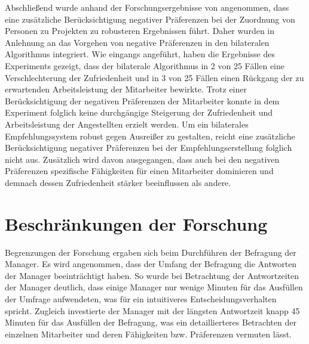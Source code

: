 Abschließend wurde anhand der Forschungsergebnisse von \textcite[S. 1ff.]{link:booklet} angenommen, dass eine zusätzliche Berücksichtigung negativer Präferenzen bei der Zuordnung von Personen zu Projekten zu robusteren Ergebnissen führt.
Daher wurden in Anlehnung an das Vorgehen von \textcite[S. 269ff.]{pizzato:2:inproceedings} negative Präferenzen in den bilateralen Algorithmus integriert.
Wie eingangs angeführt, haben die Ergebnisse des Experiments gezeigt, dass der bilaterale Algorithmus in 2 von 25 Fällen eine Verschlechterung der Zufriedenheit und in 3 von 25 Fällen einen Rückgang der zu erwartenden Arbeitsleistung der Mitarbeiter bewirkte.
Trotz einer Berücksichtigung der negativen Präferenzen der Mitarbeiter konnte in dem Experiment folglich keine durchgängige Steigerung der Zufriedenheit und Arbeitsleistung der Angestellten erzielt werden. 
Um ein bilaterales Empfehlungssystem robust gegen Ausreißer zu gestalten, reicht eine zusätzliche Berücksichtigung negativer Präferenzen bei der Empfehlungserstellung folglich nicht aus.
Zusätzlich wird davon ausgegangen, dass auch bei den negativen Präferenzen spezifische Fähigkeiten für einen Mitarbeiter dominieren und demnach dessen Zufriedenheit stärker beeinflussen als andere.


\section{Beschränkungen der Forschung}
Begrenzungen der Forschung ergaben sich beim Durchführen der Befragung der Manager.
Es wird angenommen, dass der Umfang der Befragung die Antworten der Manager beeinträchtigt haben.
So wurde bei Betrachtung der Antwortzeiten der Manager deutlich, dass einige Manager nur wenige Minuten für das Ausfüllen der Umfrage aufwendeten, was für ein intuitiveres Entscheidungsverhalten spricht.
Zugleich investierte der Manager mit der längsten Antwortzeit knapp 45 Minuten für das Ausfüllen der Befragung, was ein detaillierteres Betrachten der einzelnen Mitarbeiter und deren Fähigkeiten bzw. Präferenzen vermuten lässt.

